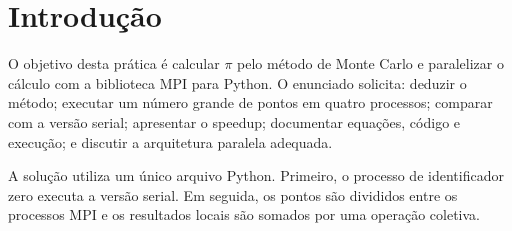 \section{Introdução}

O objetivo desta prática é calcular $\pi$ pelo método de Monte Carlo e
paralelizar o cálculo com a biblioteca MPI para Python. O enunciado solicita:
deduzir o método; executar um número grande de pontos em quatro processos;
comparar com a versão serial; apresentar o speedup; documentar equações,
código e execução; e discutir a arquitetura paralela adequada.

A solução utiliza um único arquivo Python. Primeiro, o processo de
identificador zero executa a versão serial. Em seguida, os pontos são
divididos entre os processos MPI e os resultados locais são somados por uma
operação coletiva.
